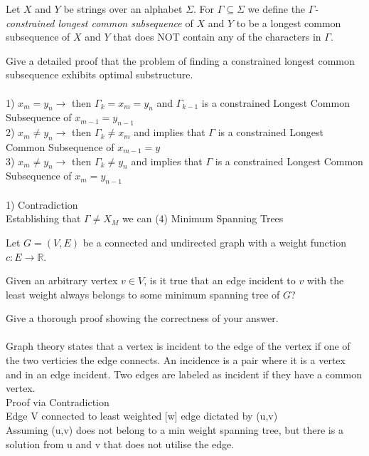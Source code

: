 \documentclass[11pt]{amsart}
\begin{document}
Let $X$ and $Y$ be strings over an alphabet $\Sigma$. For $\Gamma\subseteq \Sigma$ we define the \emph{$\Gamma$-constrained longest common subsequence } of $X$ and $Y$ to be a longest common subsequence of $X$ and $Y$ that does NOT 
contain any of the characters in $\Gamma$.\medskip

Give a detailed proof that the problem of finding a constrained longest common subsequence exhibits optimal substructure.\\\\
1) $x_m = y_n \rightarrow$ then $\Gamma_k = x_m = y_n$ and $\Gamma_{k-1}$ is a constrained Longest Common Subsequence of $x_{m-1} = y_{n-1}$
\\
2) $x_m \neq y_n \rightarrow$ then $\Gamma_k \neq x_m$ and implies that $\Gamma$ is a constrained Longest Common Subsequence of $x_{m-1} = y$
\\
3) $x_m \neq y_n \rightarrow$ then $\Gamma_k \neq y_n$ and implies that $\Gamma$ is a constrained Longest Common Subsequence of $x_m = y_{n-1}$
\\\\
1)
Contradiction\\
Establishing that $\Gamma \neq X_M$ we can 
\newpage
(4) Minimum Spanning Trees\medskip

Let $G=(V,E)$ be a connected and undirected graph with a weight function $c\colon E \to \mathbb{R}$. \medskip

Given an arbitrary vertex $v\in V$, is it true that an edge incident to $v$ with the least weight always belongs to some minimum spanning tree of $G$?\medskip

Give a thorough proof showing the correctness of your answer. 
\\\\
Graph theory states that a vertex is incident to the edge of the vertex if one of the two verticies the edge connects. An incidence is a pair where it is a vertex and in an edge incident. Two edges are labeled as incident if they have a common vertex.\\Proof via Contradiction\\Edge V connected to least weighted [w] edge dictated by (u,v)\\Assuming (u,v) does not belong to a min weight spanning tree, but there is a solution from u and v that does not utilise the edge.
\end{document}
